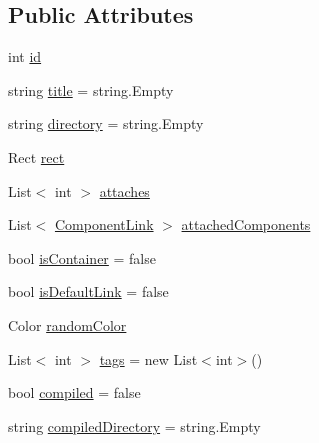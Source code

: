 \subsection*{Public Attributes}
\begin{DoxyCompactItemize}
\item 
int \hyperlink{class_unity_engine_1_1_u_i_1_1_windows_1_1_plugins_1_1_flow_1_1_flow_window_aa104f440272c2c98112523a60b9f9426}{id}
\item 
string \hyperlink{class_unity_engine_1_1_u_i_1_1_windows_1_1_plugins_1_1_flow_1_1_flow_window_a322584712da381ed07d866ec70b62d9d}{title} = string.\+Empty
\item 
string \hyperlink{class_unity_engine_1_1_u_i_1_1_windows_1_1_plugins_1_1_flow_1_1_flow_window_ab4d26fb49529e5125f64ecb8333ef204}{directory} = string.\+Empty
\item 
Rect \hyperlink{class_unity_engine_1_1_u_i_1_1_windows_1_1_plugins_1_1_flow_1_1_flow_window_a598904f0473628edea291fea82dc2a5b}{rect}
\item 
List$<$ int $>$ \hyperlink{class_unity_engine_1_1_u_i_1_1_windows_1_1_plugins_1_1_flow_1_1_flow_window_a699ee619d909eb2239826a5476537034}{attaches}
\item 
List$<$ \hyperlink{struct_unity_engine_1_1_u_i_1_1_windows_1_1_plugins_1_1_flow_1_1_flow_window_1_1_component_link}{Component\+Link} $>$ \hyperlink{class_unity_engine_1_1_u_i_1_1_windows_1_1_plugins_1_1_flow_1_1_flow_window_a542ef2c58498ffbddf9d634b8fc9625e}{attached\+Components}
\item 
bool \hyperlink{class_unity_engine_1_1_u_i_1_1_windows_1_1_plugins_1_1_flow_1_1_flow_window_a33d93fedb381d32058ee8d85407b2073}{is\+Container} = false
\item 
bool \hyperlink{class_unity_engine_1_1_u_i_1_1_windows_1_1_plugins_1_1_flow_1_1_flow_window_afed737450825dc96a5eb695c3777f8c7}{is\+Default\+Link} = false
\item 
Color \hyperlink{class_unity_engine_1_1_u_i_1_1_windows_1_1_plugins_1_1_flow_1_1_flow_window_a14355375f1727e799b2a0810b055a526}{random\+Color}
\item 
List$<$ int $>$ \hyperlink{class_unity_engine_1_1_u_i_1_1_windows_1_1_plugins_1_1_flow_1_1_flow_window_a720e730b77875db8a5adcc30aed7cc17}{tags} = new List$<$int$>$()
\item 
bool \hyperlink{class_unity_engine_1_1_u_i_1_1_windows_1_1_plugins_1_1_flow_1_1_flow_window_a5726eaa0613a3f16d15be64c5c32f21f}{compiled} = false
\item 
string \hyperlink{class_unity_engine_1_1_u_i_1_1_windows_1_1_plugins_1_1_flow_1_1_flow_window_a5283ae0afbb52869b9fa12acccd77830}{compiled\+Directory} = string.\+Empty

\end{DoxyCompactItemize}
